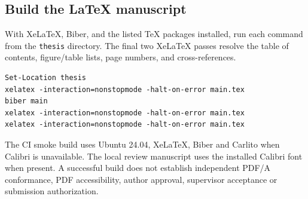 \subsection{Build the LaTeX manuscript}

With XeLaTeX, Biber, and the listed TeX packages installed, run each command from the
\texttt{thesis} directory. The final two XeLaTeX passes resolve the table of contents,
figure/table lists, page numbers, and cross-references.

\begin{verbatim}
Set-Location thesis
xelatex -interaction=nonstopmode -halt-on-error main.tex
biber main
xelatex -interaction=nonstopmode -halt-on-error main.tex
xelatex -interaction=nonstopmode -halt-on-error main.tex
\end{verbatim}

The CI smoke build uses Ubuntu 24.04, XeLaTeX, Biber and Carlito when Calibri is unavailable.
The local review manuscript uses the installed Calibri font when present. A successful build
does not establish independent PDF/A conformance, PDF accessibility, author approval,
supervisor acceptance or submission authorization.
